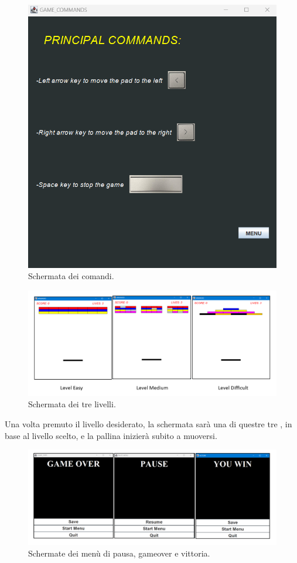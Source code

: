 \documentclass[a4paper,12pt]{report}
\begin{document}
\begin{figure}[H]
    \centering{}
    \includegraphics[scale=0.5]{images/GameCommandsGuidaUtente.png}
    \caption{Schermata dei comandi.}
    \label{images:Comandi}
\end{figure}
\begin{figure}[H]
    \centering{}
    \includegraphics[scale=0.5]{images/Leves.png}
    \caption{Schermata dei tre livelli.}
    \label{images:Levels 2}
\end{figure}
Una volta premuto il livello desiderato, la schermata sarà una di questre tre , in base al livello scelto,
e la pallina inizierà subito a muoversi.
\begin{figure}[H]
    \centering{}
    \includegraphics[scale=0.5]{images/Schermate.png}
    \caption{Schermate dei menù di pausa, gameover e vittoria.}
    \label{images:Views}
\end{figure}
\end{document}
